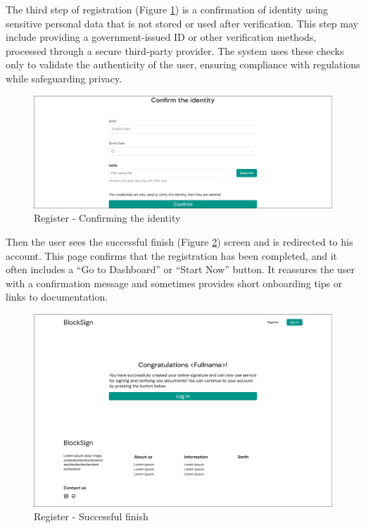 The third step of registration (Figure \ref{registerstep3}) is a confirmation of identity using sensitive personal data that is not stored or used after verification. 
This step may include providing a government-issued ID or other verification methods, processed through a secure third-party provider. 
The system uses these checks only to validate the authenticity of the user, ensuring compliance with regulations while safeguarding privacy. 

\begin{figure}[H]
    \centering
    \includegraphics[width=18cm]{"images/figmaUI/register3-crop.png"}
    \caption{Register - Confirming the identity}
    \label{registerstep3}
\end{figure}

Then the user sees the successful finish (Figure \ref{successregister}) screen and is redirected to his account. 
This page confirms that the registration has been completed, and it often includes a ``Go to Dashboard'' or ``Start Now'' button. 
It reassures the user with a confirmation message and sometimes provides short onboarding tips or links to documentation.

\begin{figure}[H]
    \centering
    \includegraphics[width=18cm]{"images/figmaUI/successregister.png"}
    \caption{Register - Successful finish}
    \label{successregister}
\end{figure}

